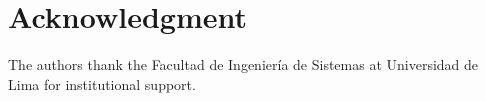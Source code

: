 \documentclass[conference]{IEEEtran}
\begin{document}
\section*{Acknowledgment}
The authors thank the Facultad de Ingenier\'{i}a de Sistemas at Universidad
de Lima for institutional support.



\end{document}
